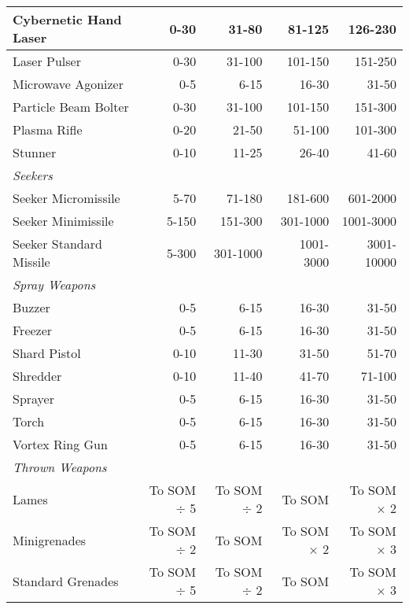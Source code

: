 \begin{table}
\begin{tabularx}{\textwidth}{|X|r|r|r|r|}
Cybernetic Hand Laser	&0-30	&31-80	&81-125	&126-230 \\ \hline

Laser Pulser	&0-30	&31-100	&101-150	&151-250 \\ \hline

Microwave Agonizer	&0-5	&6-15	&16-30	&31-50 \\ \hline

Particle Beam Bolter	&0-30	&31-100	&101-150	&151-300 \\ \hline

Plasma Rifle	&0-20	&21-50	&51-100	&101-300 \\ \hline

Stunner	&0-10	&11-25	&26-40	&41-60 \\ \hline

\multicolumn{5}{|l|}{\emph{Seekers}} \\ \hline

Seeker Micromissile	&5-70	&71-180	&181-600	&601-2000 \\ \hline

Seeker Minimissile	&5-150	&151-300	&301-1000	&1001-3000 \\ \hline

Seeker Standard Missile	&5-300	&301-1000	&1001-3000	&3001-10000 \\ \hline

\multicolumn{5}{|l|}{\emph{Spray Weapons}} \\ \hline

Buzzer	&0-5	&6-15	&16-30	&31-50\\ \hline

Freezer	&0-5	&6-15	&16-30	&31-50\\ \hline

Shard Pistol	&0-10	&11-30	&31-50	&51-70\\ \hline

Shredder	&0-10	&11-40	&41-70	&71-100\\ \hline

Sprayer	&0-5	&6-15	&16-30	&31-50\\ \hline

Torch	&0-5	&6-15	&16-30	&31-50\\ \hline

Vortex Ring Gun	&0-5	&6-15	&16-30	&31-50\\ \hline

\multicolumn{5}{|l|}{\emph{Thrown Weapons}} \\ \hline

Lames &To SOM $\div$ 5 &To SOM $\div$ 2 &To SOM &To SOM $\times$ 2 \\ \hline

Minigrenades &To SOM $\div$ 2 &To SOM &To SOM $\times$ 2 &To SOM $\times$ 3 \\ \hline

Standard Grenades &To SOM $\div$ 5 &To SOM $\div$ 2 &To SOM &To SOM $\times$ 3 \\ \hline

\end{tabularx} \end{table} 



